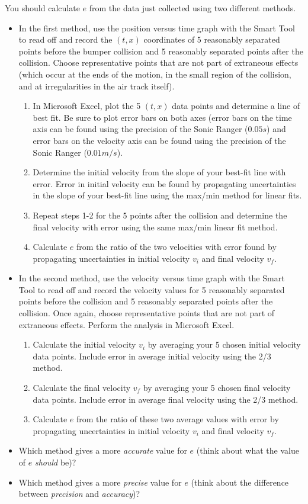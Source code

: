 You should calculate $e$ from the data just collected using two different methods. \myskip
\begin{itemize}
\item In the first method, use the position versus time graph with the Smart Tool to read off and record the $(t,x)$ coordinates of 5 reasonably separated points before the bumper collision and 5 reasonably separated points after the collision.  Choose representative points that are not part of extraneous effects (which occur at the ends of the motion, in the small region of the collision, and at irregularities in the air track itself). 
\begin{enumerate}
\item In Microsoft Excel, plot the 5 $(t,x)$ data points and determine a line of best fit. Be sure to plot error bars on both axes (error bars on the time axis can be found using the precision of the Sonic Ranger ($0.05 s$) and error bars on the velocity axis can be found using the precision of the Sonic Ranger ($0.01 m/s$).
\item Determine the initial velocity from the slope of your best-fit line with error. Error in initial velocity can be found by propagating uncertainties in the slope of your best-fit line using the max/min method for linear fits.
\item    Repeat steps 1-2 for the 5 points after the collision and determine the final velocity with error using the same max/min linear fit method. 
    \item Calculate $e$ from the ratio of the two velocities with error found by propagating uncertainties in initial velocity $v_i$ and final velocity $v_f$.
\end{enumerate}

\item In the second method, use the velocity versus time graph with the Smart Tool to read off and record the velocity values for 5 reasonably separated points before the collision and 5 reasonably separated points after the collision.  Once again, choose representative points that are not part of extraneous effects. Perform the analysis in Microsoft Excel. 
\begin{enumerate}
\item Calculate the initial velocity $v_i$ by averaging your 5 chosen initial velocity data points. Include error in average initial velocity using the 2/3 method.
\item Calculate the final velocity $v_f$ by averaging your 5 chosen final velocity data points. Include error in average final velocity using the 2/3 method.
    \item Calculate $e$ from the ratio of these two average values with error by propagating uncertainties in initial velocity $v_i$ and final velocity $v_f$.
        \end{enumerate}
    \item Which method  gives a more {\it{accurate}} value for $e$ (think about what the value of $e$ {\it{should}} be)? 
    \item Which method gives a more {\it{precise}} value for $e$ (think about the difference between {\it{precision}} and {\it{accuracy}})?
\end{itemize}
